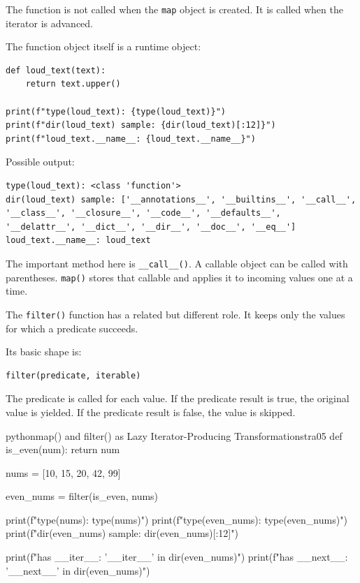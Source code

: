 The function is not called when the \texttt{map} object is created. It is called when the iterator is advanced.

The function object itself is a runtime object:

\begin{verbatim}
def loud_text(text):
    return text.upper()

print(f"type(loud_text): {type(loud_text)}")
print(f"dir(loud_text) sample: {dir(loud_text)[:12]}")
print(f"loud_text.__name__: {loud_text.__name__}")
\end{verbatim}

Possible output:

\begin{verbatim}
type(loud_text): <class 'function'>
dir(loud_text) sample: ['__annotations__', '__builtins__', '__call__',
'__class__', '__closure__', '__code__', '__defaults__',
'__delattr__', '__dict__', '__dir__', '__doc__', '__eq__']
loud_text.__name__: loud_text
\end{verbatim}

The important method here is \texttt{\_\_call\_\_()}. A callable object can be called with parentheses. \texttt{map()} stores that callable and applies it to incoming values one at a time.

The \texttt{filter()} function has a related but different role. It keeps only the values for which a predicate succeeds.

Its basic shape is:

\begin{verbatim}
filter(predicate, iterable)
\end{verbatim}

The predicate is called for each value. If the predicate result is true, the original value is yielded. If the predicate result is false, the value is skipped.

\begin{codebox}[]{python}{map() and filter() as Lazy Iterator-Producing Transformations}{tra05}
def is_even(num):
    return num %

nums = [10, 15, 20, 42, 99]

even_nums = filter(is_even, nums)

print(f"type(nums): {type(nums)}")
print(f"type(even_nums): {type(even_nums)}")
print(f"dir(even_nums) sample: {dir(even_nums)[:12]}")

print(f"has __iter__: {'__iter__' in dir(even_nums)}")
print(f"has __next__: {'__next__' in dir(even_nums)}")
\end{codebox}


